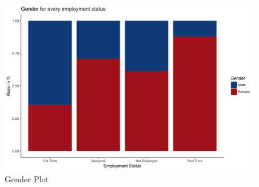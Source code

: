 \documentclass[a4paper]{article}
\begin{document}
\begin{figure}[h]
\caption{Gender Plot}
\label{figure:genderplot}
\centering
\includegraphics[width=\textwidth]{q2/plot_ouput_gender_employment.png}
\end{figure}
\end{document}
